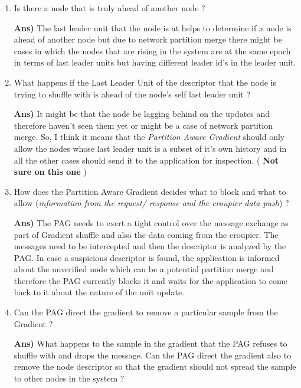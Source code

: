 \documentclass[a4paper, 11pt]{article}
\begin{document}
\begin{enumerate}



\item Is there a node that is truly ahead of another node ?

\textbf{Ans)} The last leader unit that the node is at helps to determine if a node is ahead of another node but due to network partition merge there might be cases in which the nodes that are rising in the system are at the same epoch in terms of last leader units but having different leader id's in the leader unit.



\item What happens if the Last Leader Unit of the descriptor that the node is trying to shuffle with is ahead of the node's self last leader unit ?

\textbf{Ans)} It might be that the node be lagging behind on the updates and therefore haven't seen them yet or might be a case of network partition merge. So, I think it means that the \textit{Partition Aware Gradient} should only allow the nodes whose last leader unit is a subset of it's own history and in all the other cases should send it to the application for inspection. ( \textbf{ Not sure on this one } )




\item How does the Partition Aware Gradient decides what to block and what to allow (\textit{information from the request/ response and the croupier data push}) ?

\textbf{Ans)} The PAG needs to exert a tight control over the message exchange as part of Gradient shuffle and also the data coming from the croupier. The messages need to be intercepted and then the descriptor is analyzed by the PAG. In case a suspicious descriptor is found, the application is informed about the unverified node which can be a potential partition merge and therefore the PAG currently blocks it and waits for the application to come back to it about the nature of the unit update. 


\item Can the PAG direct the gradient to remove a particular sample from the Gradient ?

\textbf{Ans)} What happens to the sample in the gradient that the PAG refuses to shuffle with and drops the message. Can the PAG direct the gradient also to remove the node descriptor so that the gradient should not spread the sample to other nodes in the system ?


\end{enumerate}
\end{document}
